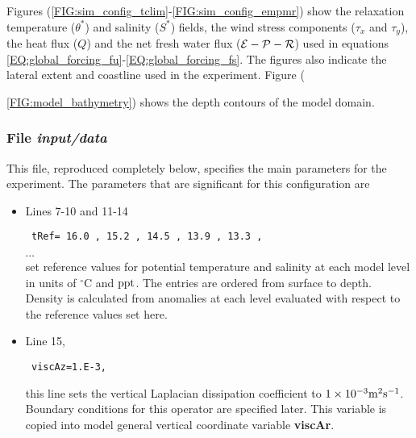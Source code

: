 Figures (\ref{FIG:sim_config_tclim}-\ref{FIG:sim_config_empmr}) show the
relaxation temperature ($\theta^{\ast}$) and salinity ($S^{\ast}$) fields,
the wind stress components ($\tau_x$ and $\tau_y$), the heat flux ($Q$)
and the net fresh water flux (${\cal E} - {\cal P} - {\cal R}$) used
in equations \ref{EQ:global_forcing_fu}-\ref{EQ:global_forcing_fs}. The figures
also indicate the lateral extent and coastline used in the experiment.
Figure ({\ref{FIG:model_bathymetry}) shows the depth contours of the model
domain.


\subsubsection{File {\it input/data}}
\label{www:tutorials}

This file, reproduced completely below, specifies the main parameters 
for the experiment. The parameters that are significant for this configuration
are

\begin{itemize}

\item Lines 7-10 and 11-14 
\begin{verbatim} tRef= 16.0 , 15.2 , 14.5 , 13.9 , 13.3 ,  \end{verbatim} 
$\cdots$ \\
set reference values for potential
temperature and salinity at each model level in units of $^{\circ}\mathrm{C}$ and
${\rm ppt}$. The entries are ordered from surface to depth.
Density is calculated from anomalies at each level evaluated
with respect to the reference values set here.\\


\item Line 15, 
\begin{verbatim} viscAz=1.E-3, \end{verbatim}
this line sets the vertical Laplacian dissipation coefficient to
$1 \times 10^{-3} {\rm m^{2}s^{-1}}$. Boundary conditions
for this operator are specified later. This variable is copied into
model general vertical coordinate variable {\bf viscAr}.



\end{itemize}}
